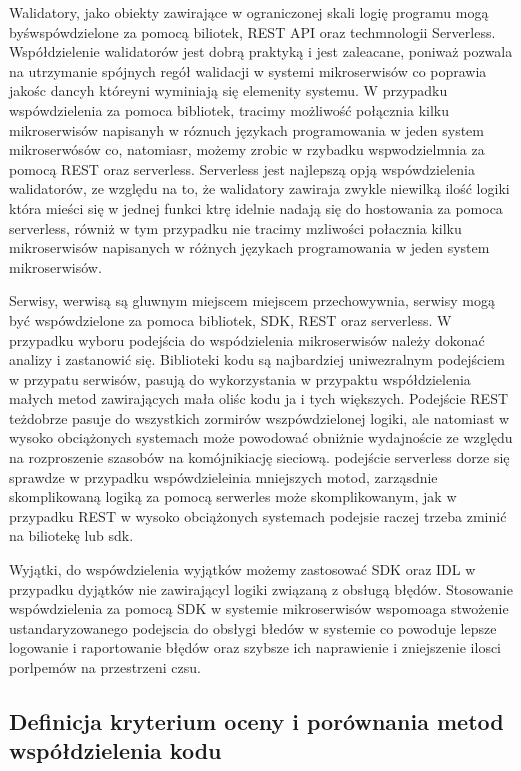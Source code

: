 \documentclass[runningheads,12pt]{llncs}
\begin{document}
Walidatory, jako obiekty zawirające w ograniczonej skali logię programu mogą byśwspówdzielone za pomocą biliotek, REST API oraz techmnologii Serverless. Współdzielenie walidatorów jest dobrą praktyką i jest zaleacane, poniważ pozwala na utrzymanie spójnych regół walidacji w systemi mikroserwisów co poprawia jakośc dancyh któreyni wyminiają się elemenity systemu. W przypadku wspówdzielenia za pomoca bibliotek, tracimy możliwość połącznia kilku mikroserwisów napisanyh w róznuch językach programowania w jeden system mikroserwósów co, natomiasr, możemy zrobic w rzybadku wspwodzielmnia za pomocą REST oraz serverless. Serverless jest najlepszą opją wspówdzielenia walidatorów, ze względu na to, że walidatory zawiraja zwykle niewilką ilość logiki która mieści się w jednej funkci ktrę idelnie nadają się do hostowania za pomoca serverless, równiż w tym przypadku nie tracimy mzliwości połacznia kilku mikroserwisów napisanych w różnych językach programowania w jeden system mikroserwisów.

Serwisy, werwisą są gluwnym miejscem miejscem przechowywnia, serwisy mogą być wspówdzielone za pomoca bibliotek, SDK, REST oraz serverless. W przypadku wyboru podejścia do wspódzielenia mikroserwisów należy dokonać analizy i zastanowić się. Biblioteki kodu są najbardziej uniwezralnym podejściem w przypatu serwisów, pasują do wykorzystania w przypaktu współdzielenia małych metod zawirających mała oliśc kodu ja i tych większych. Podejście REST teżdobrze pasuje do wszystkich zormirów wszpówdzielonej logiki, ale natomiast w wysoko obciążonych systemach może powodować obniżnie wydajnoście ze względu na rozproszenie szasobów na komójnikiację sieciową. podejście serverless dorze się sprawdze w przypadku wspówdzieleinia mniejszych motod, zarząsdnie skomplikowaną logiką za pomocą serwerles może skomplikowanym, jak w przypadku REST w wysoko obciążonych systemach podejsie raczej trzeba zminić na biliotekę lub sdk.

Wyjątki, do wspówdzielenia wyjątków możemy zastosować SDK oraz IDL w przypadku dyjątków nie zawirającyl logiki związaną z obsługą błędów. Stosowanie wspówdzielenia za pomocą SDK w systemie mikroserwisów wspomoaga stwożenie ustandaryzowanego podejscia do obsłygi błedów w systemie co powoduje lepsze logowanie i raportowanie błędów oraz szybsze ich naprawienie i zniejszenie ilosci porlpemów na przestrzeni czsu.

\subsection{Definicja kryterium oceny i porównania metod współdzielenia kodu}
\end{document}
